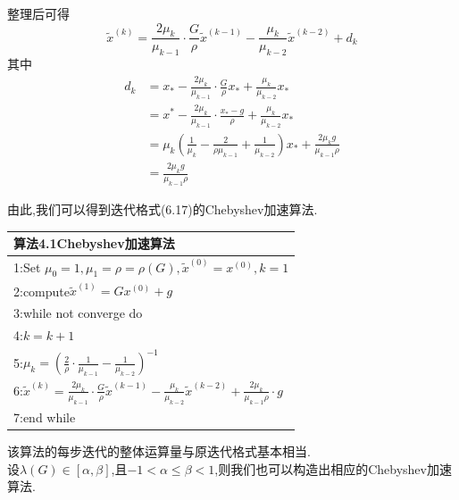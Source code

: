 \documentclass[notheorems,serif]{beamer}
\begin{document}
\begin{frame}
整理后可得
$$
\boxed{\tilde{x}^{(k)}=\frac{2 \mu_{k}}{\mu_{k-1}} \cdot \frac{G}{\rho} \tilde{x}^{(k-1)}-\frac{\mu_{k}}{\mu_{k-2}} \tilde{x}^{(k-2)}+d_{k}}
$$
其中
$$
\begin{aligned} d_{k} &=x_{*}-\frac{2 \mu_{k}}{\mu_{k-1}} \cdot \frac{G}{\rho} x_{*}+\frac{\mu_{k}}{\mu_{k-2}} x_{*} \\ &=x^{*}-\frac{2 \mu_{k}}{\mu_{k-1}} \cdot \frac{x_{*}-g}{\rho}+\frac{\mu_{k}}{\mu_{k-2}} x_{*} \\ &=\mu_{k}\left(\frac{1}{\mu_{k}}-\frac{2}{\rho \mu_{k-1}}+\frac{1}{\mu_{k-2}}\right) x_{*}+\frac{2 \mu_{k} g}{\mu_{k-1} \rho} \\ &=\frac{2 \mu_{k} g}{\mu_{k-1} \rho} \end{aligned}
$$
\end{frame}

\begin{frame}
由此,我们可以得到迭代格式(6.17)的Chebyshev加速算法.\\
\begin{tabular}{l}
\hline
{\color{blue}算法4.1}Chebyshev加速算法\\
\hline
1:Set $\mu_{0}=1, \mu_{1}=\rho=\rho(G), \tilde{x}^{(0)}=x^{(0)}, k=1$\\
2:compute$\tilde{x}^{(1)}=G x^{(0)}+g$\\
3:while not converge do\\
4:\qquad$k=k+1$\\
5:\qquad$\mu_{k}=\left(\frac{2}{\rho} \cdot \frac{1}{\mu_{k-1}}-\frac{1}{\mu_{k-2}}\right)^{-1}$\\
6:\qquad$\tilde{x}^{(k)}=\frac{2 \mu_{k}}{\mu_{k-1}} \cdot \frac{G}{\rho} \tilde{x}^{(k-1)}-\frac{\mu_{k}}{\mu_{k-2}} \tilde{x}^{(k-2)}+\frac{2 \mu_{k}}{\mu_{k-1} \rho} \cdot g$\\
7:end while\\
\hline
\end{tabular}

该算法的每步迭代的整体运算量与原迭代格式基本相当.\\
设$\lambda(G) \in[\alpha, \beta]$,且$-1<\alpha \leq \beta<1$,则我们也可以构造出相应的Chebyshev加速算法.
\end{frame}
\end{document}
